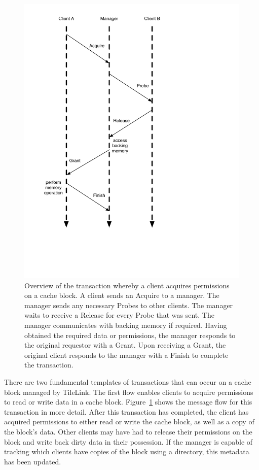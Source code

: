 \begin{figure}[t!]
\centering
\includegraphics[width=0.6\columnwidth]{tilelink/figures/standard3.pdf}
\caption{Overview of the transaction whereby a client acquires permissions on a cache block.
A client sends an Acquire to a manager.
The manager sends any necessary Probes to other clients.
The manager waits to receive a Release for every Probe that was sent.
The manager communicates with backing memory if required.
Having obtained the required data or permissions, the manager responds to the original requestor with a Grant.
Upon receiving a Grant, the original client responds to the manager with a Finish to complete the transaction.
}
\label{fig:standard3}
\end{figure}

There are two fundamental templates of transactions that can occur on a cache block managed by TileLink.
The first flow enables clients to acquire permissions to read or write data in a cache block.
Figure~\ref{fig:standard3} shows the message flow for this transaction in more detail.
After this transaction has completed, the client has acquired permissions to either read or write the cache block, as well as a copy of the block's data.
Other clients may have had to release their permissions on the block and write back dirty data in their possession.
If the manager is capable of tracking which clients have copies of the block using a directory, this metadata has been updated.

